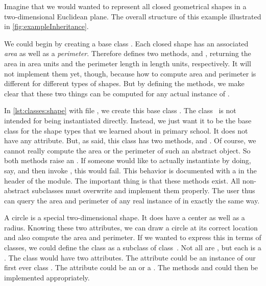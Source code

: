 Imagine that we would wanted to represent all closed geometrical shapes in a two-dimensional Euclidean plane.
The overall structure of this example illustrated in \cref{fig:exampleInheritance}.

We could begin by creating a base class .
Each closed shape has an associated \emph{area} as well as a \emph{perimeter}.
Therefore  defines two methods,  and , returning the area in area units and the perimeter length in length units, respectively.
It will not implement them yet, though, because how to compute area and perimeter is different for different types of shapes.
But by defining the methods, we make clear that these two things can be computed for any actual instance of .

In \cref{lst:classes:shape} with file , we create this base class .
The class~ is not intended for being instantiated directly.
Instead, we just want it to be the base class for the shape types that we learned about in primary school.
It does not have any attribute.
But, as said, this class has two methods,  and .
Of course, we cannot really compute the area or the perimeter of such an abstract object.
So both methods raise an .
If someone would like to actually instantiate  by doing, say,  and then invoke , this would fail.
This behavior is documented with a  in the header of the module.
The important thing is that these methods exist.
All non-abstract subclasses must overwrite and implement them properly.
The user thus can query the area and perimeter of any real instance of  in exactly the same way.

A circle is a special two-dimensional shape.
It does have a center as well as a radius.
Knowing these two attributes, we can draw a circle at its correct location and also compute the area and perimeter.
If we wanted to express this in terms of classes, we could define the class  as a subclass of class~.
Not all  are , but each  is a .
The class  would have two attributes.
The attribute  could be an instance of our first ever class .
The attribute  could be an  or a .
The methods  and  could then be implemented appropriately.

